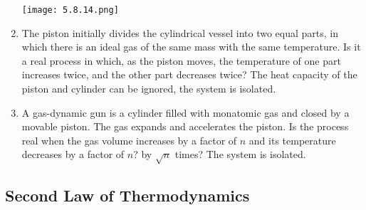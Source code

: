 \documentclass{article}
\begin{document}
\begin{enumerate}[label=5.8.\arabic*]
\begin{center}
    \texttt{[image: 5.8.14.png]}
\end{center}

\item The piston initially divides the cylindrical vessel into two equal parts, in which there is an ideal gas of the same mass with the same temperature. Is it a real process in which, as the piston moves, the temperature of one part increases twice, and the other part decreases twice? The heat capacity of the piston and cylinder can be ignored, the system is isolated.

\item A gas-dynamic gun is a cylinder filled with monatomic gas and closed by a movable piston. The gas expands and accelerates the piston. Is the process real when the gas volume increases by a factor of $n$ and its temperature decreases by a factor of $n$? by $\sqrt{n}$ times? The system is isolated.




\end{enumerate}

\subsection{Second Law of Thermodynamics}
\end{document}
